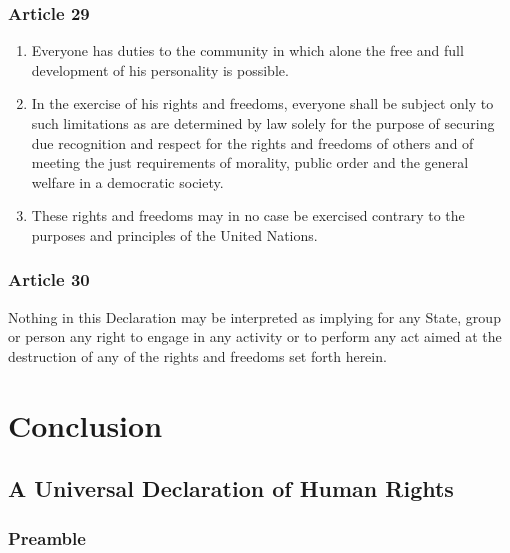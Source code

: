 \documentclass[
  titlepage,
  openright,
  DIV=calc,
  toc=listof,
  listof=nochaptergap]{scrbook}
\begin{document}
\hypertarget{article-29-3}{%
\subsection{Article 29}\label{article-29-3}}

\begin{enumerate}
\def\labelenumi{\arabic{enumi}.}
\item
  Everyone has duties to the community in which alone the free and full
  development of his personality is possible.
\item
  In the exercise of his rights and freedoms, everyone shall be subject
  only to such limitations as are determined by law solely for the
  purpose of securing due recognition and respect for the rights and
  freedoms of others and of meeting the just requirements of morality,
  public order and the general welfare in a democratic society.
\item
  These rights and freedoms may in no case be exercised contrary to the
  purposes and principles of the United Nations.
\end{enumerate}

\hypertarget{article-30-3}{%
\subsection{Article 30}\label{article-30-3}}

Nothing in this Declaration may be interpreted as implying for any
State, group or person any right to engage in any activity or to perform
any act aimed at the destruction of any of the rights and freedoms set
forth herein.

\hypertarget{sec:conclusion}{%
\chapter{Conclusion}\label{sec:conclusion}}

\hypertarget{a-universal-declaration-of-human-rights-4}{%
\section{A Universal Declaration of Human
Rights}\label{a-universal-declaration-of-human-rights-4}}

\hypertarget{preamble-4}{%
\subsection{Preamble}\label{preamble-4}}
\end{document}
